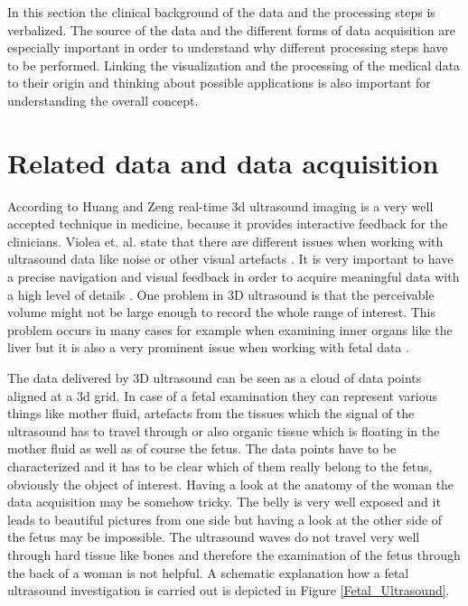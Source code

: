 
In this section the clinical background of the data and the processing steps is verbalized. The source of the data and the different forms of data acquisition are especially important in order to understand why different processing steps have to be performed. Linking the visualization and the processing of the medical data to their origin and thinking about possible applications is also important for understanding the overall concept.

\section{Related data and data acquisition}

According to Huang and Zeng \cite{Huang2017} real-time \gls{3d} ultrasound imaging is a very well accepted technique in medicine, because it provides interactive feedback for the clinicians. Violea et. al. state that there are different issues when working with ultrasound data like noise or other visual artefacts \cite{Viola2013}. It is very important to have a precise navigation and visual feedback in order to acquire meaningful data with a high level of details \cite{Viola2013}. One problem in 3D ultrasound is that the perceivable volume might not be large enough to record the whole range of interest. This problem occurs in many cases for example when examining inner organs like the liver but it is also a very prominent issue when working with fetal data \cite{Viola2013, Lee1995ThreeMode}.\newline

The data delivered by 3D ultrasound can be seen as a cloud of data points aligned at a \gls{3d} grid. In case of a fetal examination they can represent various things like mother fluid, artefacts from the tissues which the signal of the ultrasound has to travel through or also organic tissue which is floating in the mother fluid as well as of course the fetus. The data points have to be characterized and it has to be clear which of them really belong to the fetus, obviously the object of interest. Having a look at the anatomy of the woman the data acquisition may be somehow tricky. The belly is very well exposed and it leads to beautiful pictures from one side but having a look at the other side of the fetus may be impossible. The ultrasound waves do not travel very well through hard tissue like bones and therefore the examination of the fetus through the back of a woman is not helpful. A schematic explanation how a fetal ultrasound investigation is carried out is depicted in Figure \ref{Fetal_Ultrasound}.\newline\newline

